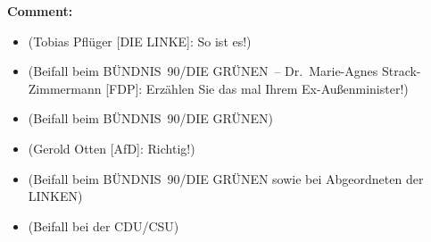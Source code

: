 \documentclass{article}
\begin{document}
\noindent\textbf{Comment:}
\begin{itemize}
    \setlength\itemsep{-3pt}
    \item (Tobias Pflüger [DIE LINKE]: So ist es!)
    \setlength\itemsep{-3pt}
    \item (Beifall beim BÜNDNIS 90/DIE GRÜNEN – Dr. Marie-Agnes Strack-Zimmermann [FDP]: Erzählen Sie das mal Ihrem Ex-Außenminister!)
    \setlength\itemsep{-3pt}
    \item (Beifall beim BÜNDNIS 90/DIE GRÜNEN)
    \setlength\itemsep{-3pt}
    \item (Gerold Otten [AfD]: Richtig!)
    \setlength\itemsep{-3pt}
    \item (Beifall beim BÜNDNIS 90/DIE GRÜNEN sowie bei Abgeordneten der LINKEN)
    \setlength\itemsep{-3pt}
    \item (Beifall bei der CDU/CSU)
\end{itemize}
\end{document}
